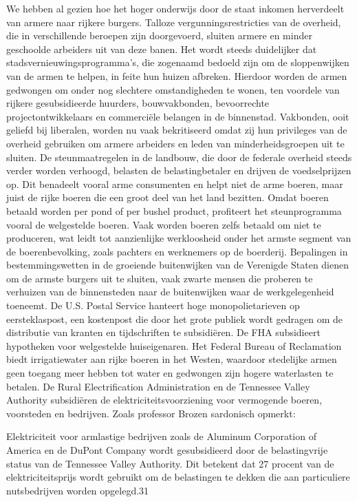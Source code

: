 \documentclass[
  a5paper,
  smalldemyvopaper,10pt,twoside,onecolumn,openright,extrafontsizes,hidelinks]{memoir}
\renewenvironment{quote}%
               {\list{}{\rightmargin=.6cm\leftmargin=.6cm}%
                \itshape \item[]}%
               {\endlist}
\begin{document}
We hebben al gezien hoe het hoger onderwijs door de staat inkomen
herverdeelt van armere naar rijkere burgers. Talloze
vergunningsrestricties van de overheid, die in verschillende beroepen
zijn doorgevoerd, sluiten armere en minder geschoolde arbeiders uit van
deze banen. Het wordt steeds duidelijker dat
stadsvernieuwingsprogramma's, die zogenaamd bedoeld zijn om de
sloppenwijken van de armen te helpen, in feite hun huizen afbreken.
Hierdoor worden de armen gedwongen om onder nog slechtere omstandigheden
te wonen, ten voordele van rijkere gesubsidieerde huurders,
bouwvakbonden, bevoorrechte projectontwikkelaars en commerciële belangen
in de binnenstad. Vakbonden, ooit geliefd bij liberalen, worden nu vaak
bekritiseerd omdat zij hun privileges van de overheid gebruiken om
armere arbeiders en leden van minderheidsgroepen uit te sluiten. De
steunmaatregelen in de landbouw, die door de federale overheid steeds
verder worden verhoogd, belasten de belastingbetaler en drijven de
voedselprijzen op. Dit benadeelt vooral arme consumenten en helpt niet
de arme boeren, maar juist de rijke boeren die een groot deel van het
land bezitten. Omdat boeren betaald worden per pond of per bushel
product, profiteert het steunprogramma vooral de welgestelde boeren.
Vaak worden boeren zelfs betaald om niet te produceren, wat leidt tot
aanzienlijke werkloosheid onder het armste segment van de
boerenbevolking, zoals pachters en werknemers op de boerderij.
Bepalingen in bestemmingswetten in de groeiende buitenwijken van de
Verenigde Staten dienen om de armste burgers uit te sluiten, vaak zwarte
mensen die proberen te verhuizen van de binnensteden naar de
buitenwijken waar de werkgelegenheid toeneemt. De U.S. Postal Service
hanteert hoge monopolietarieven op eersteklaspost, een kostenpost die
door het grote publiek wordt gedragen om de distributie van kranten en
tijdschriften te subsidiëren. De FHA subsidieert hypotheken voor
welgestelde huiseigenaren. Het Federal Bureau of Reclamation biedt
irrigatiewater aan rijke boeren in het Westen, waardoor stedelijke armen
geen toegang meer hebben tot water en gedwongen zijn hogere waterlasten
te betalen. De Rural Electrification Administration en de Tennessee
Valley Authority subsidiëren de elektriciteitsvoorziening voor
vermogende boeren, voorsteden en bedrijven. Zoals professor Brozen
sardonisch opmerkt:

\begin{quote}
Elektriciteit voor armlastige bedrijven zoals de Aluminum Corporation of
America en de DuPont Company wordt gesubsidieerd door de belastingvrije
status van de Tennessee Valley Authority. Dit betekent dat 27 procent
van de elektriciteitsprijs wordt gebruikt om de belastingen te dekken
die aan particuliere nutsbedrijven worden opgelegd.31
\end{quote}
\end{document}
